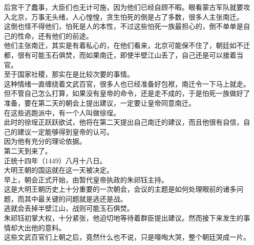 \begin{multicols}{\theparacolNo}
后宫干了蠢事，大臣们也无计可施，因为他们已经自顾不暇。眼看蒙古军队就要攻入北京，万事无头绪，人心惶惶，贪生怕死的倒是占了多数，很多人主张南迁。\\

这倒也怪不得他们，怕死是人的本性，不过这些怕死一族最担心的，倒不单单是自己的性命，还有他们的前途。\\

他们主张南迁，其实是有着私心的，在他们看来，北京可能保不住了，朝廷如不迁都，很有可能玉石俱焚，而如果南迁，即使半壁江山丢了，自己还是可以接着当官。\\

至于国家社稷，那实在是比较次要的事情。\\

这种情绪一直缠绕着文武百官，很多人也已经准备好包袱，南迁令一下马上就走。\\

但不管自己怎么打算，如果没有皇帝的命令，还是走不成的，于是怕死一族做好了准备，要在第二天的朝会上提出建议，一定要让皇帝同意南迁。\\

在这些逃跑派中，有一个人叫做徐珵。\\

此时的徐珵正跃跃欲试，他将在第二天提出自己南迁的建议，而且他很有自信，自己的建议一定能够得到皇帝的认可。\\

因为他有充分的理论依据。\\

第二天到来了。\\

正统十四年（1449）八月十八日。\\

大明王朝的国运就在这一天被决定。\\

早上，朝会正式开始，由暂代皇帝执政的朱祁钰主持。\\

这是大明王朝历史上十分重要的一次朝会，会议的主题是如何处理眼前的诸多问题，而其中最关键的问题就是逃还是战。\\

逃就会丢掉半壁江山，战则可能玉石俱焚。\\

朱祁钰初掌大权，十分紧张，他迫切地等待着群臣提出建议。然而接下来发生的事情却大出他的意料。\\

这些文武百官们上朝之后，竟然什么也不说，只是嚎啕大哭，整个朝廷哭成一片。\\


\end{multicols}
